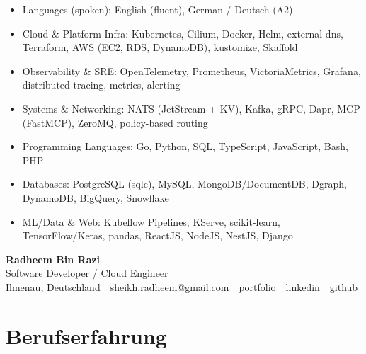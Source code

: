 \documentclass[10pt,a4paper]{resume}
\makeatletter
\newcommand{\Portfolio}{https://radheem.github.io/my-cv}
\newcommand{\PortfolioText}{portfolio}
\newcommand{\GitHub}{https://github.com/radheem}
\newcommand{\LinkedIn}{https://www.linkedin.com/in/radheem-razi}
\newcommand{\Email}{sheikh.radheem@gmail.com}
\makeatother
\begin{document}
\begin{itemize}[leftmargin=1.4em,nosep,topsep=2pt]
  \item Languages (spoken): English (fluent), German / Deutsch (A2)
  \item Cloud \& Platform Infra: Kubernetes, Cilium, Docker, Helm, external-dns, Terraform, AWS (EC2, RDS, DynamoDB), kustomize, Skaffold
  \item Observability \& SRE: OpenTelemetry, Prometheus, VictoriaMetrics, Grafana, distributed tracing, metrics, alerting
  \item Systems \& Networking: NATS (JetStream + KV), Kafka, gRPC, Dapr, MCP (FastMCP), ZeroMQ, policy-based routing
  \item Programming Languages: Go, Python, SQL, TypeScript, JavaScript, Bash, PHP
  \item Databases: PostgreSQL (sqlc), MySQL, MongoDB/DocumentDB, Dgraph, DynamoDB, BigQuery, Snowflake
  \item ML/Data \& Web: Kubeflow Pipelines, KServe, scikit-learn, TensorFlow/Keras, pandas, ReactJS, NodeJS, NestJS, Django
\end{itemize}

\clearpage
{}

\begin{center}
  {\huge\bfseries Radheem Bin Razi}\\[3pt]
  {\large Software Developer / Cloud Engineer}\\[6pt]
  \small
  Ilmenau, Deutschland \,\textbar\,
  \href{mailto:\Email}{\Email} \,\textbar\,
  \href{\Portfolio}{\PortfolioText} \,\textbar\,
  \href{\LinkedIn}{linkedin} \,\textbar\,
  \href{\GitHub}{github}
\end{center}
\vspace{2pt}

\section{Berufserfahrung}
\end{document}
